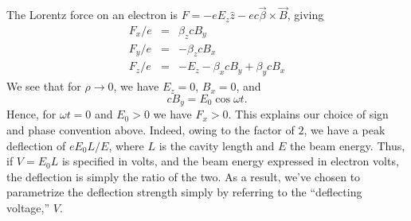 The Lorentz force on an electron is $F = -e E_z \hat{z} - e c \vec{\beta} \times \vec{B}$,
giving
\begin{eqnarray}
F_x/e & = & \beta_z c B_y \\
F_y/e & = & -\beta_z c B_x \\
F_z/e & = & -E_z - \beta_x c B_y + \beta_y c B_x 
\end{eqnarray}
We see that for $\rho \rightarrow 0$, we have $E_z = 0$, $B_x = 0$, and
\begin{equation}
c B_y = E_0 \cos \omega t.
\end{equation}
Hence, for $\omega t=0$ and $E_0>0$ we have $F_x>0$.  This explains
our choice of sign and phase convention above.  Indeed, owing to the
factor of $2$, we have a peak deflection of $e E_0 L/E$, where $L$ is
the cavity length and $E$ the beam energy.  Thus, if $V = E_0 L$ is
specified in volts, and the beam energy expressed in electron volts,
the deflection is simply the ratio of the two.  As a result, we've
chosen to parametrize the deflection strength simply by referring to
the ``deflecting voltage,'' $V$.
